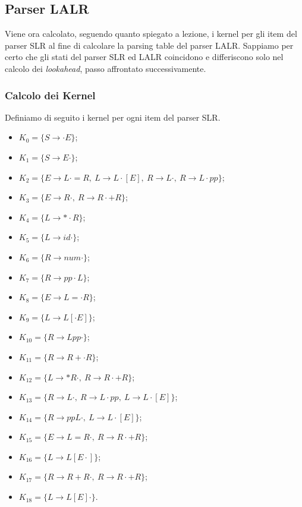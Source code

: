 \documentclass[a4paper,italian]{article}
\begin{document}
\subsection*{Parser LALR}
Viene ora calcolato, seguendo quanto spiegato a lezione, i kernel per gli item del parser SLR al fine di calcolare la parsing table del
parser LALR. Sappiamo per certo che gli stati del parser SLR ed LALR coincidono e differiscono solo nel calcolo dei \emph{lookahead},
passo affrontato successivamente.

\subsubsection*{Calcolo dei Kernel}
Definiamo di seguito i kernel per ogni item del parser SLR.
\begin{itemize}
	\item $K_{0}=\{S \rightarrow \cdot E\}$;
	\item $K_{1}=\{S\rightarrow E \cdot\}$;
	\item $K_{2}=\{E \rightarrow L\cdot = R,\  L \rightarrow L\cdot [ E ],\  R \rightarrow L\cdot ,\  R \rightarrow L\cdot pp\}$;
	\item $K_{3}=\{E \rightarrow R\cdot ,\  R \rightarrow R\cdot + R\}$;
	\item $K_{4}=\{L \rightarrow  *\cdot R\}$;
	\item $K_{5}=\{L\rightarrow id\cdot\}$;
	\item $K_{6}=\{R\rightarrow num\cdot\}$;
	\item $K_{7}=\{R \rightarrow  pp\cdot L\}$;
	\item $K_{8}=\{E \rightarrow L =\cdot R\}$;
	\item $K_{9}=\{L \rightarrow L [\cdot E ]\}$;
	\item $K_{10}=\{R \rightarrow L pp\cdot \}$;
	\item $K_{11}=\{R \rightarrow R +\cdot R\}$;
	\item $K_{12}=\{L \rightarrow * R\cdot ,\ R \rightarrow R\cdot + R\}$;
	\item $K_{13}=\{R \rightarrow L\cdot ,\ R \rightarrow L\cdot pp,\ L \rightarrow L\cdot [ E ]\}$;
	\item $K_{14}=\{R \rightarrow pp L\cdot ,\ L \rightarrow L\cdot [ E ]\}$;
	\item $K_{15}=\{E \rightarrow L = R\cdot ,\ R \rightarrow R\cdot + R\}$;
	\item $K_{16}=\{L \rightarrow L [ E\cdot ]\}$;
	\item $K_{17}=\{R \rightarrow R + R\cdot ,\ R \rightarrow R\cdot + R\}$;
	\item $K_{18}=\{L \rightarrow L [ E ]\cdot \}$.
\end{itemize}
\end{document}
